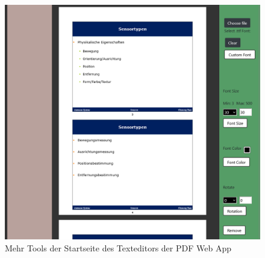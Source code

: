 \begin{figure}[!htbp]
	\centering
	\includegraphics[width=1\textwidth]{"images/texteditor2.png"}
	\caption{Mehr Tools der Startseite des Texteditors der PDF Web App}
	\label{fig:texteditor2}
\end{figure}

